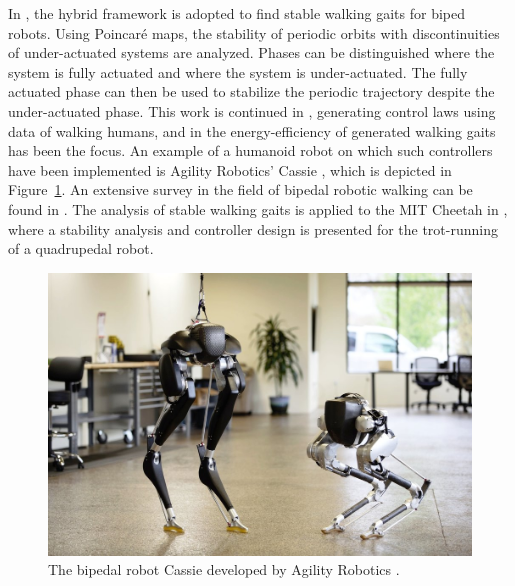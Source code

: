 \documentclass[../DC2017114Bouma.tex]{subfiles}
\begin{document}
In \cite{Grizzle2001,Morris2009}, the hybrid framework is adopted to find stable walking gaits for biped robots. Using Poincar\'{e} maps, the stability of periodic orbits with discontinuities of under-actuated systems are analyzed. Phases can be distinguished where the system is fully actuated and where the system is under-actuated. The fully actuated phase can then be used to stabilize the periodic trajectory despite the under-actuated phase. This work is continued in \cite{Ames2014}, generating control laws using data of walking humans, and in \cite{Reher2016} the energy-efficiency of generated walking gaits has been the focus. An example of a humanoid robot on which such controllers have been implemented is Agility Robotics' Cassie \cite{Cassie}, which is depicted in Figure~\ref{fig:cassie}. An extensive survey in the field of bipedal robotic walking can be found in \cite{Grizzle2014}. The analysis of stable walking gaits is applied to the MIT Cheetah in \cite{Hyun2014}, where a stability analysis and controller design is presented for the trot-running of a quadrupedal robot.  

\begin{figure}[b!]
\centering
\includegraphics[width=.6\textwidth]{cassie.jpg}\caption{The bipedal robot Cassie developed by Agility Robotics \cite{Cassie}.}\label{fig:cassie}
\end{figure}
\end{document}
